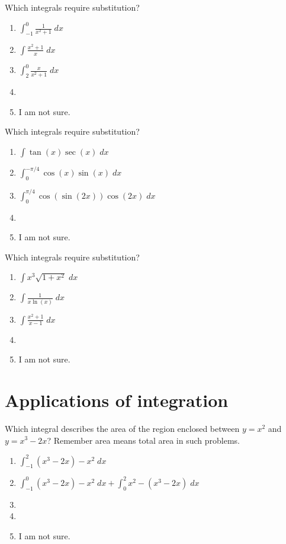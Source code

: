 \documentclass[aspectratio=169, 14pt, t]{beamer}  %
\begin{document}
\begin{poll}
  Which integrals require substitution?

  \begin{enumerate}
    \item \(\int_{-1}^{0} \frac{1}{x^{2} + 1} \;dx\)
    \item \(\int \frac{x^{2} + 1}{x} \;dx\)
    \item \(\int_{2}^{0} \frac{x}{x^{2} + 1} \;dx\)
    \item
    \item I am not sure.
  \end{enumerate}
\end{poll}

\begin{poll}
  Which integrals require substitution?

  \begin{enumerate}
    \item \(\int \tan(x) \sec(x) \;dx\)
    \item \(\int_{0}^{-\pi/4} \cos(x) \sin(x) \;dx\)
    \item \(\int_{0}^{\pi/4}  \cos(\sin(2x))\cos(2x) \;dx\)
    \item
    \item I am not sure.
  \end{enumerate}
\end{poll}

\begin{poll}
  Which integrals require substitution?

  \begin{enumerate}
    \item \(\int x^{3} \sqrt{1 + x^{2}} \;dx\)
    \item \(\int \frac{1}{x\ln(x)} \;dx\)
    \item \(\int \frac{x^{2} + 1}{x-1} \;dx\)
    \item
    \item I am not sure.
  \end{enumerate}
\end{poll}

\section{Applications of integration}

\begin{poll}
  Which integral describes the area of the region enclosed between \(y = x^{2}\) and \(y = x^{3} - 2x\)? Remember area means total area in such problems.

  \begin{enumerate}
    \item \(\int_{-1}^{2} (x^{3} - 2x) - x^{2} \;dx\)
    \item \(\int_{-1}^{0} (x^{3} - 2x) - x^{2} \;dx + \int_{0}^{2} x^{2} - (x^{3} - 2x) \;dx\)
    \item
    \item
    \item I am not sure.
  \end{enumerate}
\end{poll}
\end{document}

